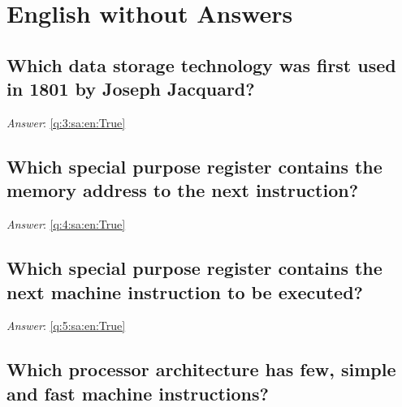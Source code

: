 \documentclass[a4paper,11pt,oneside]{book}
\begin{document}
\begin{sloppypar}
\chapter{English without Answers}
\label{englishWithoutAnswers}

\section{Which data storage technology was first used in 1801 by Joseph Jacquard?}

\label{q:3:sa:en:False}

\vspace{2cm}

\noindent\makebox[\textwidth]{\hrulefill}

\vspace{1cm}

\textit{Answer}: \autoref{q:3:sa:en:True}



\section{Which special purpose register contains the memory address to the next instruction?}

\label{q:4:sa:en:False}

\vspace{2cm}

\noindent\makebox[\textwidth]{\hrulefill}

\vspace{1cm}

\textit{Answer}: \autoref{q:4:sa:en:True}



\section{Which special purpose register contains the next machine instruction to be executed?}

\label{q:5:sa:en:False}

\vspace{2cm}

\noindent\makebox[\textwidth]{\hrulefill}

\vspace{1cm}

\textit{Answer}: \autoref{q:5:sa:en:True}



\section{Which processor architecture has few, simple and fast machine instructions?}


\end{sloppypar}
\end{document}
